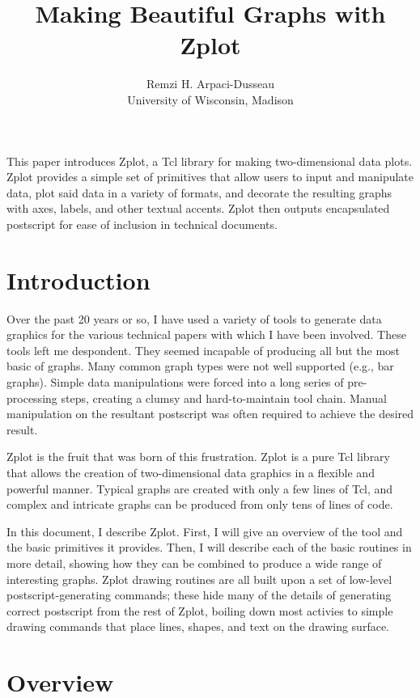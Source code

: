 
\title{Making Beautiful Graphs with Zplot}
\author{Remzi H. Arpaci-Dusseau\\
University of Wisconsin, Madison}

\begin{Abstract}

This paper introduces Zplot, a Tcl library for making two-dimensional data
plots.  Zplot provides a simple set of primitives that allow users to input
and manipulate data, plot said data in a variety of formats, and decorate the
resulting graphs with axes, labels, and other textual accents. Zplot then
outputs encapsulated postscript for ease of inclusion in technical documents.

\end{Abstract}

\section{Introduction}

Over the past 20 years or so, I have used a variety of tools to generate data
graphics for the various technical papers with which I have been
involved. These tools left me despondent. They seemed incapable of producing
all but the most basic of graphs. Many common graph types were not well
supported (e.g., bar graphs). Simple data manipulations were forced into a
long series of pre-processing steps, creating a clumsy and hard-to-maintain
tool chain. Manual manipulation on the resultant postscript was often required
to achieve the desired result.

Zplot is the fruit that was born of this frustration. Zplot is a pure Tcl
library that allows the creation of two-dimensional data graphics in a
flexible and powerful manner. Typical graphs are created with only a few lines
of Tcl, and complex and intricate graphs can be produced from only tens of
lines of code. 

In this document, I describe Zplot. First, I will give an overview of the tool
and the basic primitives it provides. Then, I will describe each of the basic
routines in more detail, showing how they can be combined to produce a wide
range of interesting graphs. Zplot drawing routines are all built upon a set
of low-level postscript-generating commands; these hide many of the details of
generating correct postscript from the rest of Zplot, boiling down most
activies to simple drawing commands that place lines, shapes, and text on the
drawing surface. 


\section{Overview}

